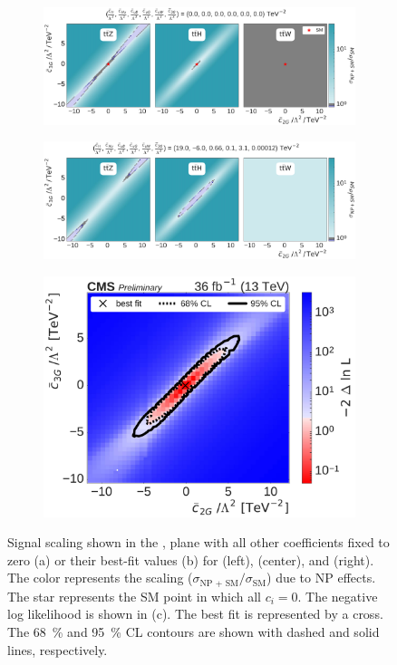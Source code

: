 \begin{figure}
  \vspace{-1cm}
  \begin{subfigure}{\linewidth}
    \centering
    \includegraphics[width=\linewidth]{figures/thirteen-TeV/scaling-frozen/c2G_c3G}
    \caption{}
  \end{subfigure}
  \begin{subfigure}{\linewidth}
    \centering
    \includegraphics[width=\linewidth]{figures/thirteen-TeV/scaling/c2G_c3G}
    \caption{}
  \end{subfigure}
  \begin{subfigure}{\linewidth}
    \centering
    \includegraphics[width=0.6\linewidth]{figures/thirteen-TeV/nll/c2G_c3G}
    \caption{}
  \end{subfigure}
  \vspace{-1cm}
  \setlength{\capwidth}{15cm}
  \caption[Signal scaling and profile likelihood scan in the \cthreeG, \ctwoG plane]{Signal scaling
  shown in the \cthreeG, \ctwoG plane with all other coefficients fixed to zero (a) or their
  best-fit values (b) for \ttZ (left), \ttH (center), and \ttW (right). The color represents the
  scaling ($\sigma_\text{NP + SM} / \sigma_\text{SM}$) due to NP effects. The star represents the SM
  point in which all $c_i=0$. The negative log likelihood is shown in (c). The best fit is represented
  by a cross. The \SI{68}{\percent} and \SI{95}{\percent} CL contours are shown with dashed and solid
  lines, respectively.}
\end{figure}

